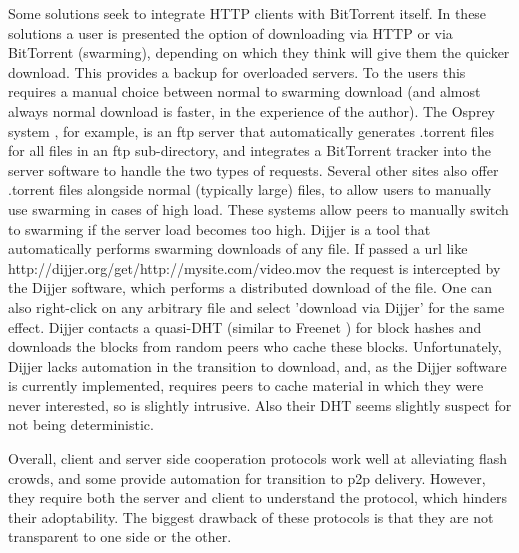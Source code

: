 {Some solutions seek to integrate HTTP clients with BitTorrent itself.  In these solutions a user is presented the option of downloading via HTTP or via BitTorrent (swarming), depending on which they think will give them the quicker download.  This provides a backup for overloaded servers.  To the users this requires a manual choice between normal to swarming download (and almost always normal download is faster, in the experience of the author).  The Osprey system \cite{osprey}, for example, is an ftp server that automatically generates .torrent files for all files in an ftp sub-directory, and integrates a BitTorrent tracker into the server software to handle the two types of requests.  Several other sites also offer .torrent files alongside normal (typically large) files, to allow users to manually use swarming in cases of high load.  These systems allow peers to manually switch to swarming if the server load becomes too high.  Dijjer \cite{dijjer} is a tool that automatically performs swarming downloads of any file.  If passed a url like http://dijjer.org/get/http://mysite.com/video.mov the request is intercepted by the Dijjer software, which performs a distributed download of the file.  One can also right-click on any arbitrary file and select 'download via Dijjer' for the same effect.  Dijjer contacts a quasi-DHT (similar to Freenet \cite{freenet}) for block hashes and downloads the blocks from random peers who cache these blocks.  Unfortunately, Dijjer lacks automation in the transition to download, and, as the Dijjer software is currently implemented, requires peers to cache material in which they were never interested, so is slightly intrusive.  Also their DHT seems slightly suspect for not being deterministic.  

Overall, client and server side cooperation protocols work well at alleviating flash crowds, and some provide automation for transition to p2p delivery.  However, they require both the server and client to understand the protocol, which hinders their adoptability.  The biggest drawback of these protocols is that they are not transparent to one side or the other.

}
